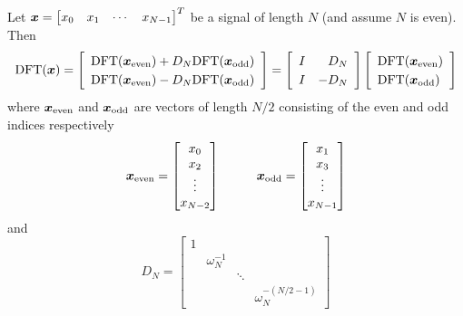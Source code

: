 \begin{theorem}
Let $\boldsymbol{x} = \begin{bmatrix} x_0 & x_1 & \cdots & x_{N-1} \end{bmatrix}^T$ be a signal of length $N$ (and assume $N$ is even). Then
$$
\mathrm{DFT}(\bs{x}) =
\renewcommand{\arraystretch}{1.25}
\left[ \begin{array}{c}
\mathrm{DFT}(\bs{x}_{\text{even}}) + D_N \mathrm{DFT}(\bs{x}_{\text{odd}}) \\
\mathrm{DFT}(\bs{x}_{\text{even}}) - D_N \mathrm{DFT}(\bs{x}_{\text{odd}})
\end{array} \right]
=
\left[ \begin{array}{rr} I & D_N \\ I & - D_N \end{array} \right]
\left[ \begin{array}{l}
\mathrm{DFT}(\bs{x}_{\text{even}}) \\
\mathrm{DFT}(\bs{x}_{\text{odd}})
\end{array} \right]
\renewcommand{\arraystretch}{1}
$$
where $\boldsymbol{x}_{\text{even}}$ and $\boldsymbol{x}_{\text{odd}}$ are vectors of length $N/2$ consisting of the even and odd indices respectively
$$
\bs{x}_{\text{even}} = \begin{bmatrix} x_0 \\ x_2 \\ \vdots \\ x_{N-2} \end{bmatrix}
\hspace{10mm}
\bs{x}_{\text{odd}} = \begin{bmatrix} x_1 \\ x_3 \\ \vdots \\ x_{N-1} \end{bmatrix}
$$
and
$$
D_N = \begin{bmatrix} 1 & & & \\ & \omega_N^{-1} & & \\ & & \ddots & \\ & & & \omega_N^{-(N/2-1)} \end{bmatrix}
$$


\end{theorem}
